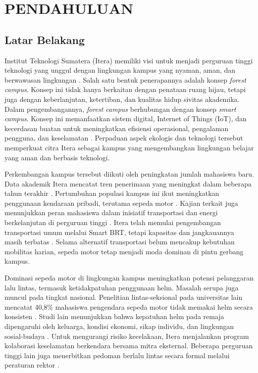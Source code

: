\chapter{PENDAHULUAN}

\section{Latar Belakang}
\label{section:latarbelakang}

Institut Teknologi Sumatera (Itera) memiliki visi untuk menjadi perguruan
tinggi teknologi yang unggul dengan lingkungan kampus yang nyaman, aman, dan
berwawasan lingkungan \cite{itera2019renstra}. Salah satu bentuk penerapannya
adalah konsep \textit{forest campus}. Konsep ini tidak hanya berkaitan dengan
penataan ruang hijau, tetapi juga dengan keberlanjutan, ketertiban, dan
kualitas hidup sivitas akademika. Dalam pengembangannya, \textit{forest campus}
berhubungan dengan konsep \textit{smart campus}. Konsep ini memanfaatkan sistem
digital, Internet of Things (IoT), dan kecerdasan buatan untuk meningkatkan
efisiensi operasional, pengalaman pengguna, dan keselamatan
\cite{Polin2023SmartCampus}. Perpaduan aspek ekologis dan teknologi tersebut
memperkuat citra Itera sebagai kampus yang mengembangkan lingkungan belajar
yang aman dan berbasis teknologi.

Perkembangan kampus tersebut diikuti oleh peningkatan jumlah mahasiswa baru.
Data akademik Itera mencatat tren penerimaan yang meningkat dalam beberapa
tahun terakhir \cite{itera2025dashboard}. Pertumbuhan populasi kampus ini ikut
meningkatkan penggunaan kendaraan pribadi, terutama sepeda motor
\cite{purwanti2018analisisitenas}. Kajian terkait juga menunjukkan peran
mahasiswa dalam inisiatif transportasi dan energi berkelanjutan di perguruan
tinggi \cite{rachmadian2024kesadaran}. Itera telah memulai pengembangan
transportasi umum melalui Smart BRT, tetapi kapasitas dan jangkauannya masih
terbatas \cite{antaranews2025brt}. Selama alternatif transportasi belum
mencakup kebutuhan mobilitas harian, sepeda motor tetap menjadi moda dominan di
pintu gerbang kampus.

Dominasi sepeda motor di lingkungan kampus meningkatkan potensi pelanggaran
lalu lintas, termasuk ketidakpatuhan penggunaan helm. Masalah serupa juga
muncul pada tingkat nasional. Penelitian lintas-seksional pada universitas lain
mencatat 40,8\% mahasiswa pengendara sepeda motor tidak memakai helm secara
konsisten \cite{safitri2020gambaran}. Studi lain menunjukkan bahwa kepatuhan
helm pada remaja dipengaruhi oleh keluarga, kondisi ekonomi, sikap individu,
dan lingkungan sosial-budaya \cite{nobrihas2023kepatuhan}. Untuk mengurangi
risiko kecelakaan, Itera menjalankan program kolaborasi keselamatan berkendara
bersama mitra eksternal. Beberapa perguruan tinggi lain juga menerbitkan
pedoman berlalu lintas secara formal melalui peraturan rektor
\cite{iteranews2024kolaborasi,its2025pedoman}.

